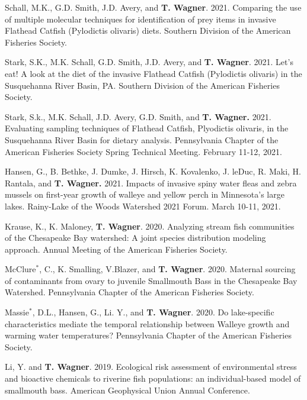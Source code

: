 \documentclass[10pt]{article}
\begin{document}
\begin{flushleft}
\begin{etaremune}
\item Schall, M.K., G.D. Smith, J.D. Avery, and \textbf{T. Wagner}. 2021. Comparing the use of multiple molecular techniques for identification of prey items in invasive Flathead Catfish (Pylodictis olivaris) diets. Southern Division of the American Fisheries Society.

\item Stark, S.K., M.K. Schall, G.D. Smith, J.D. Avery, and \textbf{T. Wagner}. 2021. Let’s eat! A look at the diet of the invasive Flathead Catfish (Pylodictis olivaris) in the Susquehanna River Basin, PA. Southern Division of the American Fisheries Society.

\item Stark, S.k., M.K. Schall, J.D. Avery, G.D. Smith, and \textbf{T. Wagner.} 2021. Evaluating sampling techniques of Flathead Catfish, Plyodictis olivaris, in the Susquehanna River Basin for dietary analysis. Pennsylvania Chapter of the American Fisheries Society Spring Technical Meeting. February 11-12, 2021.

\item Hansen, G., B. Bethke, J. Dumke, J. Hirsch, K. Kovalenko, J. leDuc, R. Maki, H. Rantala, and \textbf{T. Wagner.} 2021. Impacts of invasive spiny water fleas and zebra mussels on first-year growth of walleye and yellow perch in Minnesota’s large lakes. Rainy-Lake of the Woods Watershed 2021 Forum. March 10-11, 2021.

\item Krause, K., K. Maloney, \textbf{T. Wagner}. 2020. Analyzing stream fish communities of the Chesapeake Bay watershed: A joint species distribution modeling approach. Annual Meeting of the American Fisheries Society. 

\item McClure$^*$, C., K. Smalling, V.Blazer, and \textbf{T. Wagner}. 2020. Maternal sourcing of contaminants from ovary to juvenile Smallmouth Bass in the Chesapeake Bay Watershed. Pennsylvania Chapter of the American Fisheries Society.

\item Massie$^*$, D.L., Hansen, G., Li. Y., and \textbf{T. Wagner}. 2020. Do lake-specific characteristics mediate the temporal relationship between Walleye growth and warming water temperatures? Pennsylvania Chapter of the American Fisheries Society.

\item Li, Y. and \textbf{T. Wagner}. 2019. Ecological risk assessment of environmental stress and bioactive chemicals to riverine fish populations: an individual-based model of smallmouth bass. American Geophysical Union Annual Conference.


\end{etaremune}
\end{flushleft}
\end{document}
